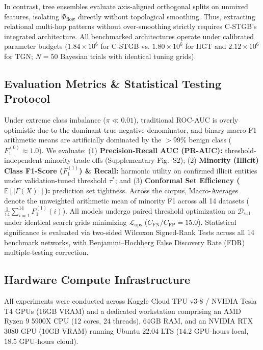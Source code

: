 In contrast, tree ensembles evaluate axis-aligned orthogonal splits on unmixed features, isolating $\Phi_{\text{flow}}$ directly without topological smoothing. Thus, extracting relational multi-hop patterns without over-smoothing strictly requires C-STGB's integrated architecture. All benchmarked architectures operate under calibrated parameter budgets ($1.84 \times 10^6$ for C-STGB vs. $1.80 \times 10^6$ for HGT and $2.12 \times 10^6$ for TGN; $N=50$ Bayesian trials with identical tuning grids).

\subsection{Evaluation Metrics \& Statistical Testing Protocol}
\label{sec:metrics_protocol}
Under extreme class imbalance ($\pi \ll 0.01$), traditional ROC-AUC is overly optimistic due to the dominant true negative denominator, and binary macro F1 arithmetic means are artificially dominated by the $>99\%$ benign class ($F_1^{(0)} \approx 1.0$). We evaluate: (1) \textbf{Precision-Recall AUC (PR-AUC):} threshold-independent minority trade-offs (Supplementary Fig.~S2); (2) \textbf{Minority (Illicit) Class F1-Score ($F_1^{(1)}$) \& Recall:} harmonic utility on confirmed illicit entities under validation-tuned threshold $\tau^*$; and (3) \textbf{Conformal Set Efficiency ($\mathbb{E}[|\Gamma(X)|]$):} prediction set tightness. Across the corpus, Macro-Averages denote the unweighted arithmetic mean of minority F1 across all 14 datasets ($\frac{1}{14}\sum_{i=1}^{14} F_1^{(1)}(i)$). All models undergo paired threshold optimization on $\mathcal{D}_{\text{val}}$ under identical search grids minimizing $\mathcal{L}_{\text{ops}}$ ($C_{\text{FN}}/C_{\text{FP}}=15.0$). Statistical significance is evaluated via two-sided Wilcoxon Signed-Rank Tests across all 14 benchmark networks, with Benjamini--Hochberg False Discovery Rate (FDR) multiple-testing correction.

\subsection{Hardware Compute Infrastructure}
\label{sec:hardware_infra}
All experiments were conducted across Kaggle Cloud TPU v3-8 / NVIDIA Tesla T4 GPUs (16GB VRAM) and a dedicated workstation comprising an AMD Ryzen 9 5900X CPU (12 cores, 24 threads), 64GB RAM, and an NVIDIA RTX 3080 GPU (10GB VRAM) running Ubuntu 22.04 LTS ($14.2$ GPU-hours local, $18.5$ GPU-hours cloud).

